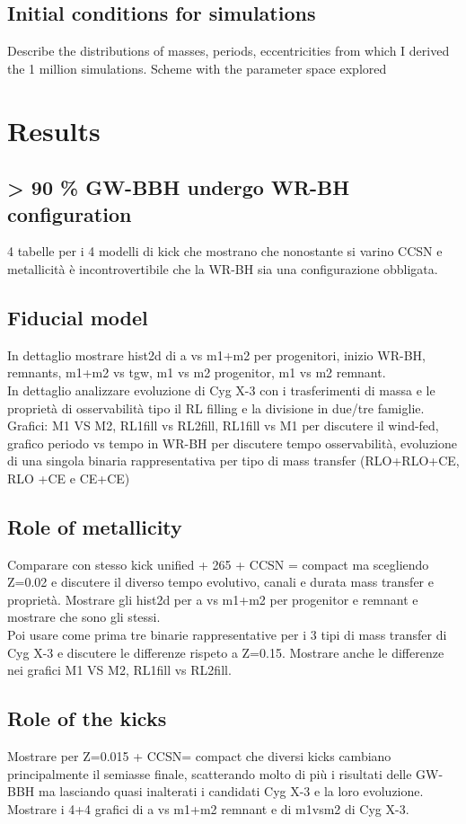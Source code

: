 \documentclass[a4paper,titlepage]{book}     	%
\begin{document}
\section{Initial conditions for simulations}
Describe the distributions of masses, periods, eccentricities from which I derived the 1 million simulations. Scheme with the parameter space explored

\chapter{Results}\label{sec:results}
\section{> 90 \% GW-BBH undergo WR-BH configuration}
4 tabelle per i 4 modelli di kick che mostrano che nonostante si varino CCSN e metallicità è incontrovertibile che la WR-BH sia una configurazione obbligata.

\section{Fiducial model}
In dettaglio mostrare hist2d di a vs m1+m2 per progenitori, inizio WR-BH, remnants, m1+m2 vs tgw, m1 vs m2 progenitor, m1 vs m2 remnant.\\
In dettaglio analizzare evoluzione di Cyg X-3 con i trasferimenti di massa e le proprietà di osservabilità tipo il RL filling e la divisione in due/tre famiglie. Grafici: M1 VS M2, RL1fill vs RL2fill, RL1fill vs M1 per discutere il wind-fed, grafico periodo vs tempo in WR-BH per discutere tempo osservabilità, evoluzione di una singola binaria rappresentativa per tipo di mass transfer (RLO+RLO+CE, RLO +CE e CE+CE)

\section{Role of metallicity}
Comparare con stesso kick unified + 265 + CCSN = compact ma scegliendo Z=0.02 e discutere il diverso tempo evolutivo, canali e durata mass transfer e proprietà.
Mostrare gli hist2d per a vs m1+m2 per progenitor e remnant e mostrare che sono gli stessi.\\
Poi usare come prima tre binarie rappresentative per i 3 tipi di mass transfer di Cyg X-3 e discutere le differenze rispeto a Z=0.15. Mostrare anche le differenze nei grafici M1 VS M2, RL1fill vs RL2fill.


\section{Role of the kicks}
Mostrare per Z=0.015 + CCSN= compact che diversi kicks cambiano principalmente il semiasse finale, scatterando molto di più i risultati delle GW-BBH ma lasciando quasi inalterati i candidati Cyg X-3 e la loro evoluzione. Mostrare i 4+4 grafici di a vs m1+m2 remnant e di m1vsm2 di Cyg X-3.
\end{document}
